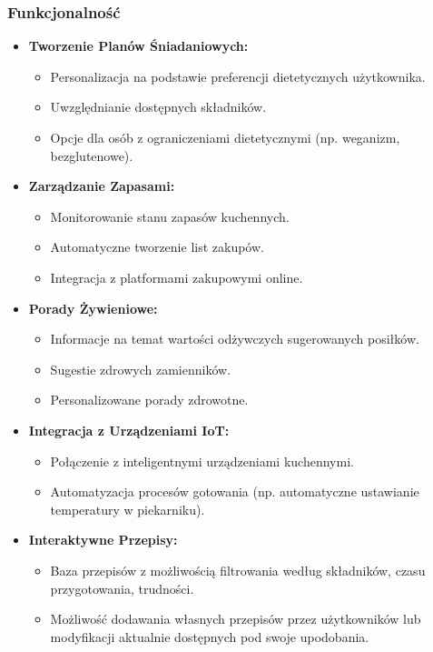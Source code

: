 \documentclass[a4paper,12pt]{article}
\begin{document}
\subsubsection{Funkcjonalność}
\begin{itemize}
    \item \textbf{Tworzenie Planów Śniadaniowych:}
    \begin{itemize}
        \item Personalizacja na podstawie preferencji dietetycznych użytkownika.
        \item Uwzględnianie dostępnych składników.
        \item Opcje dla osób z ograniczeniami dietetycznymi (np. weganizm, bezglutenowe).
    \end{itemize}
    \item \textbf{Zarządzanie Zapasami:}
    \begin{itemize}
        \item Monitorowanie stanu zapasów kuchennych.
        \item Automatyczne tworzenie list zakupów.
        \item Integracja z platformami zakupowymi online.
    \end{itemize}
    \item \textbf{Porady Żywieniowe:}
    \begin{itemize}
        \item Informacje na temat wartości odżywczych sugerowanych posiłków.
        \item Sugestie zdrowych zamienników.
        \item Personalizowane porady zdrowotne.
    \end{itemize}
    \item \textbf{Integracja z Urządzeniami IoT:}
    \begin{itemize}
        \item Połączenie z inteligentnymi urządzeniami kuchennymi.
        \item Automatyzacja procesów gotowania (np. automatyczne ustawianie temperatury w piekarniku).
    \end{itemize}
    \item \textbf{Interaktywne Przepisy:}
    \begin{itemize}
        \item Baza przepisów z możliwością filtrowania według składników, czasu przygotowania, trudności.
        \item Możliwość dodawania własnych przepisów przez użytkowników lub modyfikacji aktualnie dostępnych pod swoje upodobania.

\end{itemize}
\end{itemize}
\end{document}

